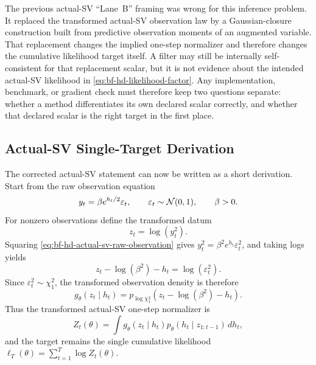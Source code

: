The previous actual-SV ``Lane~B'' framing was wrong for this inference problem.
It replaced the transformed actual-SV observation law by a Gaussian-closure
construction built from predictive observation moments of an augmented variable.
That replacement changes the implied one-step normalizer and therefore changes
the cumulative likelihood target itself.  A filter may still be internally
self-consistent for that replacement scalar, but it is not evidence about the
intended actual-SV likelihood in \eqref{eq:bf-hd-likelihood-factor}.  Any
implementation, benchmark, or gradient check must therefore keep two questions
separate: whether a method differentiates its own declared scalar correctly, and
whether that declared scalar is the right target in the first place.

\subsection{Actual-SV Single-Target Derivation}
\label{sec:bf-hd-actual-sv-single-target-derivation}

The corrected actual-SV statement can now be written as a short derivation.
Start from the raw observation equation
\begin{equation}
  y_t=\beta e^{h_t/2}\varepsilon_t,
  \qquad
  \varepsilon_t\sim \mathcal{N}(0,1),
  \qquad
  \beta>0.
  \label{eq:bf-hd-actual-sv-raw-observation}
\end{equation}
For nonzero observations define the transformed datum
\begin{equation}
  z_t=\log(y_t^2).
  \label{eq:bf-hd-actual-sv-z-definition}
\end{equation}
Squaring \eqref{eq:bf-hd-actual-sv-raw-observation} gives
\(
  y_t^2=\beta^2 e^{h_t}\varepsilon_t^2
\), and taking logs yields
\begin{equation}
  z_t-\log(\beta^2)-h_t
  =
  \log(\varepsilon_t^2).
  \label{eq:bf-hd-actual-sv-transform-identity}
\end{equation}
Since \(\varepsilon_t^2\sim\chi_1^2\), the transformed observation density is
therefore
\begin{equation}
  g_\theta(z_t\mid h_t)
  =
  p_{\log\chi_1^2}\!\left(z_t-\log(\beta^2)-h_t\right).
  \label{eq:bf-hd-actual-sv-transform-density}
\end{equation}
Thus the transformed actual-SV one-step normalizer is
\begin{equation}
  Z_t(\theta)
  =
  \int g_\theta(z_t\mid h_t)
  p_\theta(h_t\mid z_{1:t-1})\,dh_t,
  \label{eq:bf-hd-actual-sv-normalizer}
\end{equation}
and the target remains the single cumulative likelihood
\(
  \ell_T(\theta)=\sum_{t=1}^T\log Z_t(\theta)
\).


